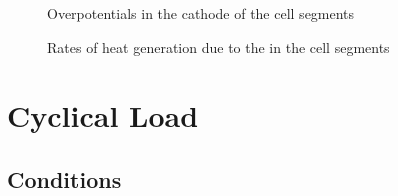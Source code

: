 \begin{figure}[htbp]
  \caption{Overpotentials in the cathode of the cell segments}
  \label{fig:SegmentOverpot}
\end{figure}

\begin{figure}[htbp]
  \caption[Rates of heat generation due to the ORR in the cell segments]{Rates of heat generation due to the  in the cell segments}
  \label{fig:SegmentHeatGen}
\end{figure}


\FloatBarrier %
\section{Cyclical Load}
\label{sec:Cycle}

\subsection{Conditions}

